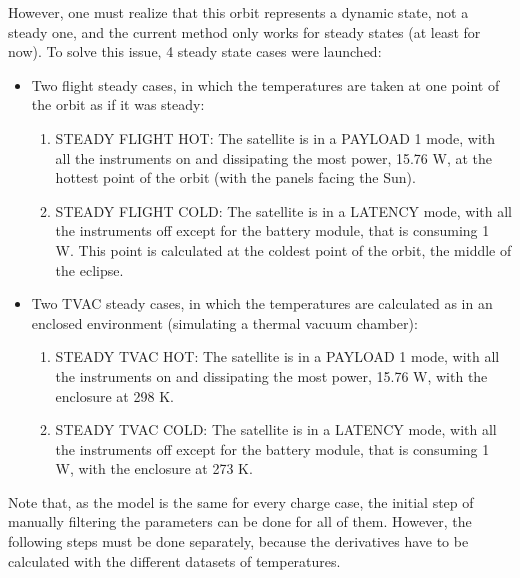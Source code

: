     However, one must realize that this orbit represents a dynamic state, not a steady one, and the current method only works for steady states (at least for now). To solve this issue, 4 steady state cases were launched:
    \begin{itemize}
    \item Two flight steady cases, in which the temperatures are taken at one point of the orbit as if it was steady:
    \begin{enumerate}
        \item STEADY FLIGHT HOT: The satellite is in a PAYLOAD 1 mode, with all the instruments on and dissipating the most power, 15.76 W, at the hottest point of the orbit (with the panels facing the Sun).
        \item STEADY FLIGHT COLD: The satellite is in a LATENCY mode, with all the instruments off except for the battery module, that is consuming 1 W. This point is calculated at the coldest point of the orbit, the middle of the eclipse.
    \end{enumerate}
    \item Two TVAC steady cases, in which the temperatures are calculated as in an enclosed environment (simulating a thermal vacuum chamber):
    \begin{enumerate}
        \item STEADY TVAC HOT: The satellite is in a PAYLOAD 1 mode, with all the instruments on and dissipating the most power, 15.76 W, with the enclosure at 298 K.
        \item STEADY TVAC COLD: The satellite is in a LATENCY mode, with all the instruments off except for the battery module, that is consuming 1 W, with the enclosure at 273 K. 
    \end{enumerate}
    \end{itemize}

    Note that, as the model is the same for every charge case, the initial step of manually filtering the parameters can be done for all of them. However, the following steps must be done separately, because the derivatives have to be calculated with the different datasets of temperatures.

